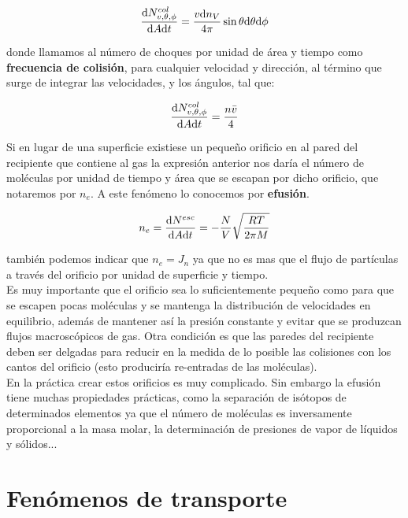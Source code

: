 \documentclass[12pt,a4paper,oneside]{book}
\begin{document}
\begin{equation}
\dfrac{\mathrm{d} N^{col}_{v,\theta,\phi}}{\mathrm{d} A \mathrm{d} t} = \dfrac{v \mathrm{d} n_V}{4 \pi} \sin \theta \mathrm{d} \theta \mathrm{d} \phi
\end{equation} 

donde llamamos al número de choques por unidad de área y tiempo como \textbf{frecuencia de colisión}, para cualquier velocidad y dirección, al término que surge de integrar las velocidades, y los ángulos, tal que:

\begin{equation}
\dfrac{\mathrm{d} N^{col}_{v,\theta,\phi}}{\mathrm{d} A \mathrm{d} t} = \dfrac{n \bar{v}}{4}
\end{equation}

Si en lugar de una superficie existiese un pequeño orificio en al pared del recipiente que contiene al gas la expresión anterior nos daría el número de moléculas por unidad de tiempo y área que se escapan por dicho orificio, que notaremos por $n_e$. A este fenómeno lo conocemos por \textbf{efusión}. 

\begin{equation}
n_e = \dfrac{\mathrm{d} N^{esc}}{\mathrm{d} A \mathrm{d} t } = - \dfrac{N}{V} \sqrt{\dfrac{RT}{2 \pi M}}
\end{equation}

también podemos indicar que $n_e = J_n$ ya que no es mas que el flujo de partículas a través del orificio por unidad de superficie y tiempo. \\

Es muy importante que el orificio sea lo suficientemente pequeño como para que se escapen pocas moléculas y se mantenga la distribución de velocidades en equilibrio, además de mantener así la presión constante y evitar que se produzcan flujos macroscópicos de gas. Otra condición es que las paredes del recipiente deben ser delgadas para reducir en la medida de lo posible las colisiones con los cantos del orificio (esto produciría re-entradas de las moléculas). \\

En la práctica crear estos orificios es muy complicado.  Sin embargo la efusión tiene muchas propiedades prácticas, como la separación de isótopos de determinados elementos ya que el número de moléculas es inversamente proporcional a la masa molar, la determinación de presiones de vapor de líquidos y sólidos... 

\chapter{Fenómenos de transporte}
\end{document}
